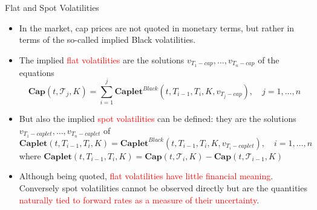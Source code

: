 \documentclass{beamer}
\begin{document}

\begin{frame}{Flat and Spot Volatilities}
	\begin{itemize}
		\item<1-> In the market, cap prices are not quoted in monetary terms, but rather in terms of the so-called implied Black volatilities. 
		\item<2-> The implied \textcolor{red}{flat volatilities} are the solutions $v_{T_1-cap},\ldots, v_{T_n-cap}$ of the equations
		\begin{equation*}
			\textbf{Cap}(t, \mathcal{T}_j, K) = \sum_{i=1}^j \textbf{Caplet}^{Black}(t, T_{i-1}, T_i,K,v_{T_j-cap}),\quad j=1, \ldots,n
		\end{equation*}
		\item<3-> But also the implied \textcolor{red}{spot volatilities} can be defined: they are the solutions $v_{T_1-caplet},\ldots, v_{T_n-caplet}$ of
		\begin{equation*}
			\textbf{Caplet}(t, T_{i-1},T_i,K) = \textbf{Caplet}^{Black}(t, T_{i-1}, T_i,K,v_{T_i-caplet}),\quad i=1, \ldots,n
		\end{equation*} 
		where $\textbf{Caplet}(t, T_{i-1}, T_i, K) = \textbf{Cap}(t, \mathcal{T}_i,K)-\textbf{Cap}(t, \mathcal{T}_{i-1},K)$
		\item<4-> Although being quoted, \textcolor{red}{flat volatilities have little financial meaning}. Conversely spot volatilities cannot be observed directly but are the quantities \textcolor{red}{naturally tied to forward rates as a measure of their uncertainty}.
		\end{itemize}
\end{frame}
\end{document}
